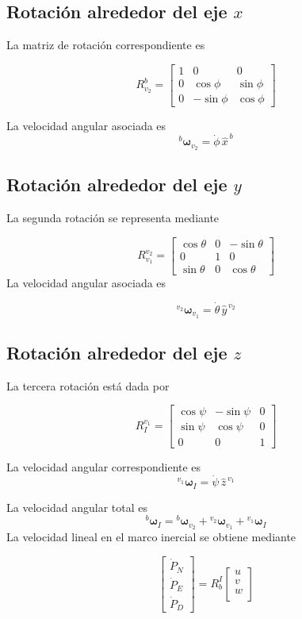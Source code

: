 \documentclass[11pt,a4paper]{article}
\begin{document}
\subsection*{Rotación alrededor del eje $x$}
La matriz de rotación correspondiente es

\[
R^{b}_{v_2}=
\begin{bmatrix}
1 & 0 & 0\\
0 & \cos\phi & \sin\phi\\
0 & -\sin\phi & \cos\phi
\end{bmatrix}
\]

La velocidad angular asociada es
\[
{}^{b}\boldsymbol{\omega}_{v_2}
=
\dot{\phi}\,
\hat{x}^{\,b}
\]

\subsection*{Rotación alrededor del eje $y$}
La segunda rotación se representa mediante

\[
R^{v_2}_{v_1}=
\begin{bmatrix}
\cos\theta & 0 & -\sin\theta\\
0 & 1 & 0\\
\sin\theta & 0 & \cos\theta
\end{bmatrix}
\]
La velocidad angular asociada es

\[
{}^{v_2}\boldsymbol{\omega}_{v_1}
=
\dot{\theta}\,
\hat{y}^{\,v_2}
\]

\subsection*{Rotación alrededor del eje $z$}
La tercera rotación está dada por

\[
R^{v_1}_{I}=
\begin{bmatrix}
\cos\psi & -\sin\psi & 0\\
\sin\psi & \cos\psi & 0\\
0 & 0 & 1
\end{bmatrix}
\]

La velocidad angular correspondiente es
\[
{}^{v_1}\boldsymbol{\omega}_{I}
=
\dot{\psi}\,
\hat{z}^{\,v_1}
\]

La velocidad angular total es
\[
{}^{b}\boldsymbol{\omega}_{I}
=
{}^{b}\boldsymbol{\omega}_{v_2}
+
{}^{v_2}\boldsymbol{\omega}_{v_1}
+
{}^{v_1}\boldsymbol{\omega}_{I}
\]
La velocidad lineal en el marco inercial se obtiene mediante

\[
\begin{bmatrix}
\dot{P}_N\\
\dot{P}_E\\
\dot{P}_D
\end{bmatrix}
=
R^{I}_{b}
\begin{bmatrix}
u\\
v\\
w\\
\end{bmatrix}
\]
\end{document}

